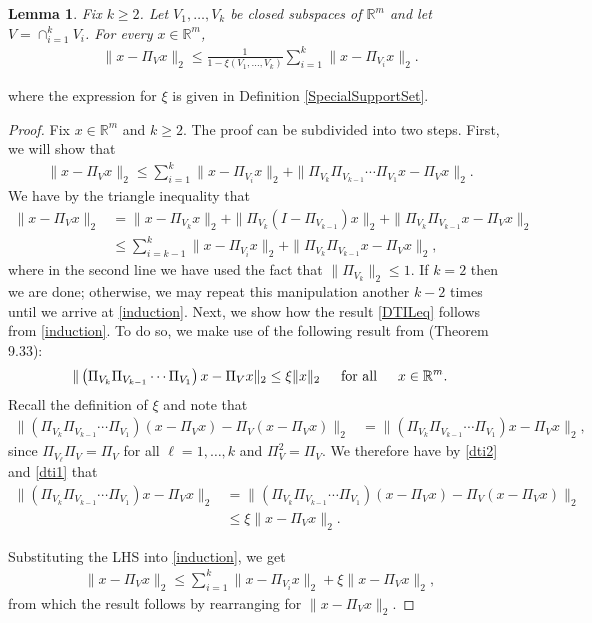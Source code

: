 \documentclass[journal, onecolumn]{IEEEtran}
\newtheorem{lemma}{Lemma}
\begin{document}

\begin{lemma}\label{DistanceToIntersectionLemma}
Fix $k \geq 2$. Let $V_1, \ldots, V_k$ be closed subspaces of $\mathbb{R}^m$ and let $V = \cap_{i=1}^k V_i$. For every $x \in \mathbb{R}^m$,
\begin{align}\label{DTILeq}
\|x - \Pi_V x\|_2 \leq \frac{1}{1 - \xi(V_1, \ldots, V_k)} \sum_{i=1}^k \|x - \Pi_{V_i} x\|_2.
\end{align}
\end{lemma}
%
where the expression for $\xi$ is given in Definition \ref{SpecialSupportSet}.

\begin{proof} 
Fix $x \in \mathbb{R}^m$ and $k \geq 2$. The proof can be subdivided into two steps. First, we will show that
\begin{align}\label{induction}
\|x - \Pi_Vx\|_2 \leq \sum_{i=1}^k \|x - \Pi_{V_i} x\|_2 + \|\Pi_{V_k}\Pi_{V_{k-1}}\cdots\Pi_{V_1} x - \Pi_V x\|_2.
\end{align}
%
We have by the triangle inequality that
\begin{align*}
\|x - \Pi_Vx\|_2 &= \|x - \Pi_{V_k} x\|_2 + \|\Pi_{V_k}(I - \Pi_{V_{k-1}}) x\|_2 + \|\Pi_{V_k}\Pi_{V_{k-1}}x - \Pi_Vx\|_2 \\
&\leq \sum_{i=k-1}^k\|x - \Pi_{V_i} x\|_2 + \|\Pi_{V_k}\Pi_{V_{k-1}} x - \Pi_V x\|_2,
\end{align*}
%
where in the second line we have used the fact that $\|\Pi_{V_k}\|_2 \leq 1$. If $k=2$ then we are done; otherwise, we may repeat this manipulation another $k-2$ times until we arrive at \eqref{induction}. Next, we show how the result \eqref{DTILeq} follows from \eqref{induction}. To do so, we make use of the following result from \cite{Deutsch} (Theorem 9.33):
\begin{align}\label{dti2}
\|\left(\Pi_{V_k}\Pi_{V_{k-1}}\cdots\Pi_{V_1}\right)x - \Pi_Vx\|_2 \leq \xi \|x\|_2 \indent \text{for all} \indent x \in \mathbb{R}^m.
\end{align}
%
Recall the definition of $\xi$ and note that
\begin{align}\label{dti1}
\|(\Pi_{V_k}\Pi_{V_{k-1}}\cdots\Pi_{V_1})(x - \Pi_Vx) - \Pi_V(x - \Pi_Vx)\|_2 
&= \|(\Pi_{V_k}\Pi_{V_{k-1}}\cdots\Pi_{V_1}) x - \Pi_V x \|_2,
\end{align}
%
since $\Pi_{V_\ell} \Pi_V = \Pi_V$ for all $\ell = 1, \ldots, k$ and $\Pi_V^2 = \Pi_V$.
%
We therefore have by \eqref{dti2} and \eqref{dti1} that
\begin{align*}
\|(\Pi_{V_k}\Pi_{V_{k-1}}\cdots\Pi_{V_1}) x - \Pi_V x \|_2
&= \|(\Pi_{V_k}\Pi_{V_{k-1}}\cdots\Pi_{V_1})(x - \Pi_Vx) - \Pi_V(x - \Pi_Vx)\|_2 \\
&\leq \xi \|x - \Pi_Vx\|_2.
\end{align*}

Substituting the LHS into \eqref{induction}, we get
\begin{align*}
\|x - \Pi_Vx\|_2 \leq \sum_{i=1}^k \|x - \Pi_{V_i} x\|_2 + \xi \|x - \Pi_Vx\|_2,
\end{align*}
%
from which the result follows by rearranging for $\|x - \Pi_Vx\|_2$.
\end{proof}
\end{document}
